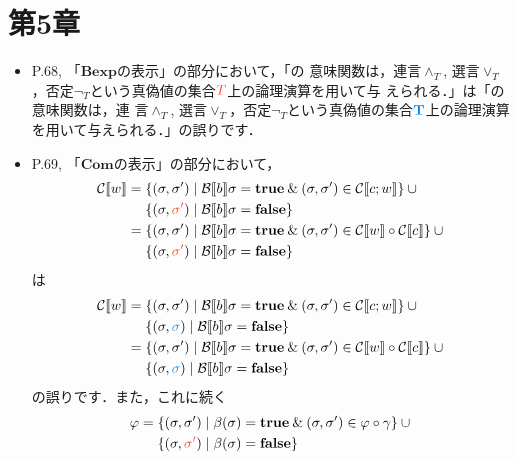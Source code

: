 \documentclass[12pt,titlepage,twoside,openright,dvipdfmx]{jsbook}
\newcommand\old[1]{%
  \textcolor[rgb]{1.0,0.25,0.1}{#1}%
  }
\newcommand\new[1]{%
  \textcolor[rgb]{0,0.55,1.0}{#1}%
  }
\theoremstyle{definition}
\begin{document}
\section*{第5章}

\begin{itemize}
\item P.68,
  「$\mathbf{Bexp}$の表示」の部分において，「\termbooleanexpression{}の
  意味関数は，連言$\wedge_T$,
  選言$\vee_T$，否定$\neg_T$という真偽値の集合$\old{T}$上の論理演算を用いて与
  えられる．」は「\termbooleanexpression{}の意味関数は，連
  言$\wedge_T$,
  選言$\vee_T$，否定$\neg_T$という真偽値の集合$\new{\mathbf{T}}$上の論理演算
  を用いて与えられる．」の誤りです．
\item P.69, 「$\mathbf{Com}$の表示」の部分において，
  \begin{align*}
      \denotation{C}{w} = {} & \{(\sigma,\sigma')\mid  \denotation{B}{b}\sigma=\mathbf{true} \AND (\sigma,\sigma')\in\denotation{C}{c;w}\}\cup {}\\
                             & \{(\sigma,\old{\sigma'})\mid  \denotation{B}{b}\sigma=\mathbf{false}\} \\
      = {} & \{(\sigma,\sigma')\mid  \denotation{B}{b}\sigma=\mathbf{true} \AND (\sigma,\sigma')\in \denotation{C}{w} \circ \denotation{C}{c} \}\cup {}\\
                             & \{(\sigma,\old{\sigma'})\mid  \denotation{B}{b}\sigma=\mathbf{false}\}
  \end{align*}
  は
  \begin{align*}
      \denotation{C}{w} = {} & \{(\sigma,\sigma')\mid  \denotation{B}{b}\sigma=\mathbf{true} \AND (\sigma,\sigma')\in\denotation{C}{c;w}\}\cup {}\\
                             & \{(\sigma,\new{\sigma})\mid  \denotation{B}{b}\sigma=\mathbf{false}\} \\
      = {} & \{(\sigma,\sigma')\mid  \denotation{B}{b}\sigma=\mathbf{true} \AND (\sigma,\sigma')\in \denotation{C}{w} \circ \denotation{C}{c} \}\cup {}\\
                             & \{(\sigma,\new{\sigma})\mid  \denotation{B}{b}\sigma=\mathbf{false}\}
  \end{align*}
  の誤りです．また，これに続く
  \begin{align*}
    \varphi = {} & \{(\sigma,\sigma')\mid \beta(\sigma)=\mathbf{true} \AND
                   (\sigma,\sigma')\in \varphi\circ\gamma \} \cup {} \\
                 & \{(\sigma,\old{\sigma'})\mid \beta(\sigma)=\mathbf{false} \}

\end{align*}
\end{itemize}
\end{document}
